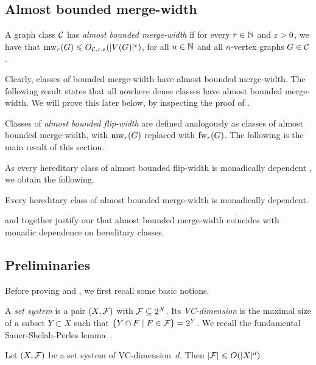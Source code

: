 



\subsection{Almost bounded merge-width}\label{sec:abmw}
A graph class $\CC$ has \emph{almost bounded merge-width}
if for every $r\in\N$ and $\eps>0$,
we have that $\mw_r(G)\le O_{\CC,r,\eps}(|V(G)|^\eps)$, for all $n\in\N$ and all $n$-vertex graphs $G\in\CC$.

Clearly, classes of bounded merge-width have almost bounded merge-width.
The following result states that all nowhere dense classes have almost bounded merge-width. We will prove this later below, by inspecting the proof of .

\thmnwd*

Classes of \emph{almost bounded flip-width} are defined analogously as classes of almost bounded merge-width, with $\mw_r(G)$ replaced with $\fw_r(G)$.
The following is the main result of this section.

\thmabmw*

As every hereditary class of almost bounded flip-width is monadically dependent \cite[Thm. 2.12]{flip-breakability}, we obtain the following.
\begin{corollary}\label{cor:abmw-mNIP}
    Every hereditary class of almost bounded merge-width is monadically dependent.
\end{corollary}

 and  together justify our 
that almost bounded merge-width coincides with monadic dependence on hereditary classes.










\subsection{Preliminaries}
Before proving  and , 
we first recall some basic notions.

\medskip
A \emph{set system} is a pair $(X,\cal F)$ with $\cal F\subset 2^X$.
Its \emph{VC-dimension} is the maximal size of a subset $Y\subset X$ such that 
$\setof{Y\cap F}{F\in\cal F}=2^Y$.
We recall the fundamental Sauer-Shelah-Perles lemma~\cite{sauer,shelah-sauer-lemma}.

\begin{lemma}\label{lem:sauer-shelah-perles}
  Let $(X,\cal F)$ be a set system of VC-dimension~$d$.
  Then $|\cal F|\le O(|X|^d)$.
\end{lemma}

